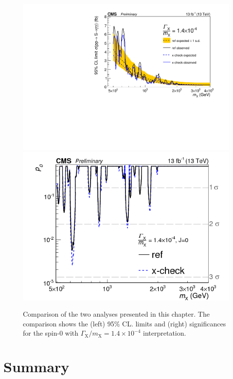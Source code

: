 \begin{figure}[htb]
    \centering
    \includegraphics[width=\cmsFigWidth]{HighMassDiphoton/summary_limits_xcheck_001.pdf}
    \includegraphics[width=\cmsFigWidth]{HighMassDiphoton/comparison_pval_xcheck001.png} 
    \caption{Comparison of the two analyses presented in this
      chapter. The comparison shows the
      (left) 95\% CL. limits and (right) significances for
      the  spin-0 with  $\Gamma_{\mathrm{X}}/m_{\mathrm{X}} =
1.4\times10^{-4}$ interpretation.
      \label{fig:anaComparison}
    }
\end{figure}
\section{Summary}

